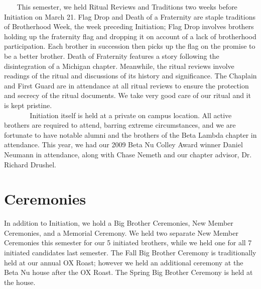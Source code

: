     This semester, we held Ritual Reviews and Traditions two weeks before Initiation on March 21. Flag Drop and Death of a Fraternity are staple traditions of Brotherhood Week, the week preceding Initiation; Flag Drop involves brothers holding up the fraternity flag and dropping it on account of a lack of brotherhood participation. Each brother in succession then picks up the flag on the promise to be a better brother. Death of Fraternity features a story following the disintegration of a Michigan chapter. Meanwhile, the ritual reviews involve readings of the ritual and discussions of its history and significance. The Chaplain and First Guard are in attendance at all ritual reviews to ensure the protection and secrecy of the ritual documents. We take very good care of our ritual and it is kept pristine. \\
    
    Initiation itself is held at a private on campus location. All active brothers are required to attend, barring extreme circumstances, and we are fortunate to have notable alumni and the brothers of the Beta Lambda chapter in attendance. This year, we had our 2009 Beta Nu Colley Award winner Daniel Neumann in attendance, along with Chase Nemeth and our chapter advisor, Dr. Richard Drushel. 
    
  \section*{Ceremonies}
    In addition to Initiation, we hold a Big Brother Ceremonies, New Member Ceremonies, and a Memorial Ceremony. We held two separate New Member Ceremonies this semester for our 5 initiated brothers, while we held one for all 7 initiated candidates last semester. The Fall Big Brother Ceremony is traditionally held at our annual OX Roast; however we held an additional ceremony at the Beta Nu house after the OX Roast. The Spring Big Brother Ceremony is held at the house. 
